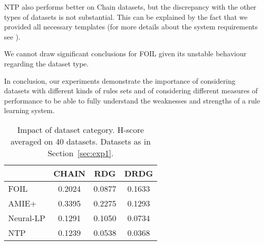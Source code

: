 \documentclass[letterpaper]{article} \usepackage{aaai20}  \usepackage{times}  \usepackage{helvet} \usepackage{courier}  \usepackage[hyphens]{url}  \usepackage{graphicx} \urlstyle{rm} \def\UrlFont{\rm}  \usepackage{graphicx}  \frenchspacing  \setlength{\pdfpagewidth}{8.5in}  \setlength{\pdfpageheight}{11in}  \usepackage{amsthm}
\theoremstyle{definition}
\begin{document}
NTP also performs better on Chain datasets, but the discrepancy with the other types of datasets is not substantial. This can be explained by the fact that we provided all necessary templates (for more details about the system requirements see \cite{RoR-NIPS17}). 

We cannot draw significant conclusions for FOIL given its unstable behaviour regarding the dataset type.

In conclusion, our experiments demonstrate the importance of considering datasets with different kinds of rules sets and of considering different measures of performance to be able to fully understand the weaknesses and strengths of a rule learning system.

\begin{table}[h!]
    \centering
\begin{tabular}{lccc}
    \toprule
& CHAIN &  RDG & DRDG  \\
     \midrule
     FOIL & 0.2024 &	0.0877 &	0.1633     \\
     AMIE+ &  0.3395 &	0.2275 &	0.1293 \\
     Neural-LP & 0.1291 &	0.1050 &	0.0734 \\
     NTP  & 0.1239 &	0.0538 &	0.0368  \\
     \bottomrule
    \end{tabular}
     \caption{Impact of dataset category. H-score averaged on 40 datasets. Datasets as in Section~\ref{sec:exp1}.
    }
    \label{tab:result_3}
\end{table}
\end{document}
